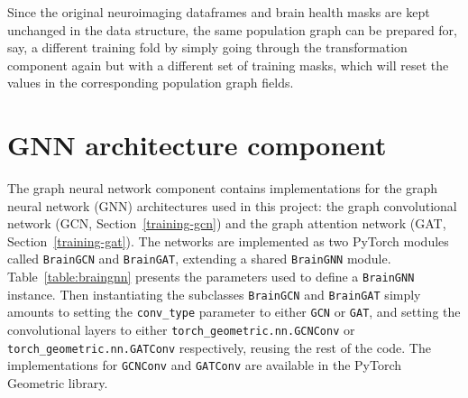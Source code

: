 Since the original neuroimaging dataframes and brain health masks are kept unchanged in the data structure, the same population graph can be prepared for, say, a different training fold by simply going through the transformation component again but with a different set of training masks, which will reset the values in the corresponding population graph fields.

\section{GNN architecture component}
\label{section:gnn-architecture}

The graph neural network component contains implementations for the graph neural network (GNN) architectures used in this project: the graph convolutional network (GCN, Section~\ref{training-gcn}) and the graph attention network (GAT, Section~\ref{training-gat}). The networks are implemented as two PyTorch modules called \texttt{BrainGCN} and \texttt{BrainGAT}, extending a shared \texttt{BrainGNN} module. Table~\ref{table:braingnn} presents the parameters used to define a \texttt{BrainGNN} instance. Then instantiating the subclasses \texttt{BrainGCN} and \texttt{BrainGAT} simply amounts to setting the \texttt{conv\_type} parameter to either \texttt{GCN} or \texttt{GAT}, and setting the convolutional layers to either \texttt{torch\_geometric.nn.GCNConv} or \texttt{torch\_geometric.nn.GATConv} respectively, reusing the rest of the code. The implementations for \texttt{GCNConv} and \texttt{GATConv} are available in the PyTorch Geometric library.


